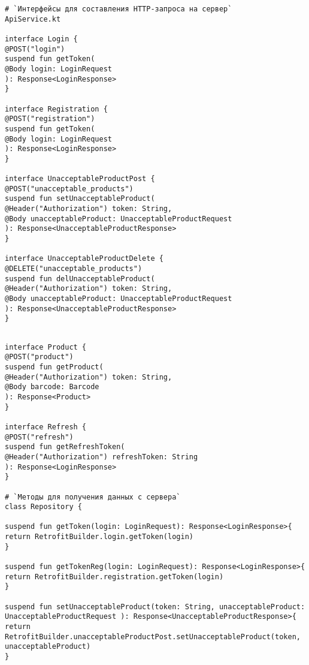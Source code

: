 \vspace{\baselineskip}

\begin{lstlisting}
# `Интерфейсы для составления HTTP-запроса на сервер`
ApiService.kt

interface Login {
@POST("login")
suspend fun getToken(
@Body login: LoginRequest
): Response<LoginResponse>
}

interface Registration {
@POST("registration")
suspend fun getToken(
@Body login: LoginRequest
): Response<LoginResponse>
}

interface UnacceptableProductPost {
@POST("unacceptable_products")
suspend fun setUnacceptableProduct(
@Header("Authorization") token: String,
@Body unacceptableProduct: UnacceptableProductRequest
): Response<UnacceptableProductResponse>
}

interface UnacceptableProductDelete {
@DELETE("unacceptable_products")
suspend fun delUnacceptableProduct(
@Header("Authorization") token: String,
@Body unacceptableProduct: UnacceptableProductRequest
): Response<UnacceptableProductResponse>
}
\end{lstlisting}
\clearpage
{}
\begin{lstlisting}

interface Product {
@POST("product")
suspend fun getProduct(
@Header("Authorization") token: String,
@Body barcode: Barcode
): Response<Product>
}

interface Refresh {
@POST("refresh")
suspend fun getRefreshToken(
@Header("Authorization") refreshToken: String
): Response<LoginResponse>
}

# `Методы для получения данных с сервера`
class Repository {

suspend fun getToken(login: LoginRequest): Response<LoginResponse>{
return RetrofitBuilder.login.getToken(login)
}

suspend fun getTokenReg(login: LoginRequest): Response<LoginResponse>{
return RetrofitBuilder.registration.getToken(login)
}

suspend fun setUnacceptableProduct(token: String, unacceptableProduct: UnacceptableProductRequest ): Response<UnacceptableProductResponse>{
return RetrofitBuilder.unacceptableProductPost.setUnacceptableProduct(token, unacceptableProduct)
}

\end{lstlisting}
\clearpage
{}
